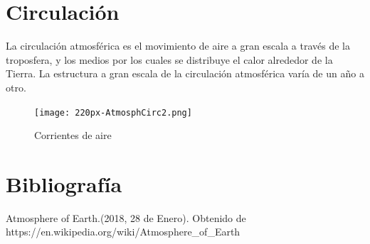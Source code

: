 \documentclass{article}
\begin{document}
\section{Circulación}

La circulación atmosférica es el movimiento de aire a gran escala a través de la troposfera, y los medios por los cuales se distribuye el calor alrededor de la Tierra. La estructura a gran escala de la circulación atmosférica varía de un año a otro.


\begin{figure}
   \caption{Corrientes de aire}
   \texttt{[image: 220px-AtmosphCirc2.png]}%
   \centering
   \label{Atmósfera de la Tierra}%
  \end{figure}
  
  \section{Bibliografía}
  
  Atmosphere of Earth.(2018, 28 de Enero). Obtenido de https://en.wikipedia.org/wiki/Atmosphere\_of\_Earth
  


\end{document}
